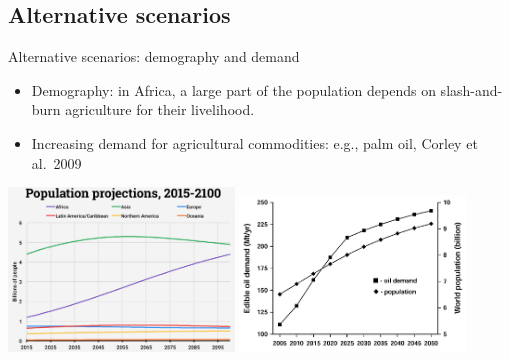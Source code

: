 \documentclass[10pt,table,dvipsnames,compress]{beamer}
\begin{document}
\subsection{Alternative scenarios}
\label{sec:orgce54724}
\begin{frame}[label={sec:org320016d}]{Alternative scenarios: demography and demand}
\begin{itemize}
\item Demography: in Africa, a large part of the population depends on
slash-and-burn agriculture for their livelihood.
\item Increasing demand for agricultural commodities: e.g., palm oil, Corley
et al. 2009
\end{itemize}

\vspace{0.25cm}
\centering \includegraphics[width=0.45\textwidth]{figs/UN-regional-pop-projections}
\centering \includegraphics[width=0.45\textwidth]{figs/oil-palm-proj}
\end{frame}
\end{document}
